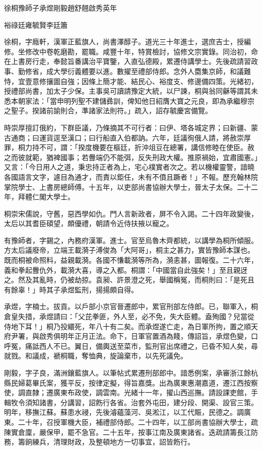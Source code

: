 
\begin{pinyinscope}
徐桐豫師子承煜剛毅趙舒翹啟秀英年

裕祿廷雍毓賢李廷簫

徐桐，字廕軒，漢軍正藍旗人，尚書澤醇子。道光三十年進士，選庶吉士，授編修。坐修改中卷乾磨勘，罷職。咸豐十年，特賞檢討，協修文宗實錄。同治初，命在上書房行走，奉懿旨番講治平寶鑒，入直弘德殿，累遷侍講學士。先後疏請習政事、勤修省，成大學衍義體要以進。數擢至禮部侍郎。念外人麕集京師，和議難恃，宜壹意修攘圖自強；因條上簡才能、結民心、裕度支、修邊備四策。光緒初，授禮部尚書，加太子少保。主事吳可讀請豫定大統，以尸諫，桐與翁同龢等謂其未悉本朝家法：「當申明列聖不建儲彞訓，俾知他日紹膺大寶之元良，即為承繼穆宗之聖子。揆諸前諭則合，準諸家法則符。」疏入，詔存毓慶宮備覽。

時崇厚擅訂俄約，下群臣議，乃條摘其不可行者：曰伊、塔各城定界；曰新疆、蒙古通商；曰運貨逕至漢口；曰行船直入伯都訥。六年，廷議徇俄人請，將赦崇厚罪，桐力持不可，謂：「揆度機要在樞廷，折沖俎豆在總署，講信修睦在使臣。赦之而彼就範，猶裨國事；若釁端仍不能弭，反失刑政大權。推原禍始，宜肅國憲。」又言：「今日用人之道，秉忠持正者為上，宅心樸實者次之。若以機權靈警，諳曉各國語言文字，遽目為通才，而責以鉅任，未有不僨且蹶者！」不報。歷充翰林院掌院學士、上書房總師傅。十五年，以吏部尚書協辦大學士，晉太子太保。二十二年，拜體仁閣大學士。

桐崇宋儒說，守舊，惡西學如仇。門人言新政者，屏不令入謁。二十四年政變後，太后以其耆臣碩望，頗優禮，朝請令近侍扶掖以寵之。

有豫師者，字錫之，內務府漢軍。進士。官至烏魯木齊都統，以講學為桐所傾服。方太后議廢帝，立端王載漪子溥俊為「大阿哥」，桐主之甚力，實皆豫師本謀也。既而桐被命照料，益親載漪。各國不慊載漪等所為，漪恚甚，圖報復。二十六年，義和拳起釁仇外，載漪大喜，導之入都。桐謂：「中國當自此強矣！」至且親迓之。然及其亂時，仍被劫掠。袁昶、許景澄之死，舉國稱冤，而桐則曰：「是死且有餘辜！」時其子承煜監刑，揚揚頗自得。

承煜，字楠士。拔貢。以戶部小京官晉遷郎中，累官刑部左侍郎。已，聯軍入，桐倉皇失措，承煜請曰：「父芘拳匪，外人至，必不免，失大臣體。盍殉國？兒當從侍地下耳！」桐乃投繯死，年八十有二矣。而承煜遂亡走，為日軍所拘，置之順天府尹署，與啟秀俱明年正月正法。命下，日軍官置酒為餞，傳詔旨，承煜色變，口呼冤，痛詆西人不已。翼日，備輿送至菜市，監刑官出席禮之，已昏不知人矣，尋就戮。和議成，褫桐職，奪恤典，旋論棄市，以先死議免。

剛毅，字子良，滿洲鑲藍旗人。以筆帖式累遷刑部郎中。諳悉例案，承審浙江餘杭縣民婦葛畢氏案，獲平反，按律定擬，得旨嘉獎。出為廣東惠潮嘉道，遷江西按察使，調直隸；遷廣東布政使，調雲南。光緒十一年，擢山西巡撫。請設課吏館，手輯牧令須知諸書，分講習，詔飭行各省。治套外屯田，建分段、開渠、設官三策。明年，移撫江蘇。蘇患水祲，先後濬蘊藻河、吳淞江，以工代賑，民德之。調廣東。二十年，召授軍機大臣，補禮部侍郎。二十四年，以工部尚書協辦大學士，疏陳實倉廩，嚴保甲，罷不急官。二十五年，按事江南及廣東諸省。迭疏請籌長江防務，籌餉練兵，清理財政，及整頓地方一切事宜，詔皆飭行。


\end{pinyinscope}
